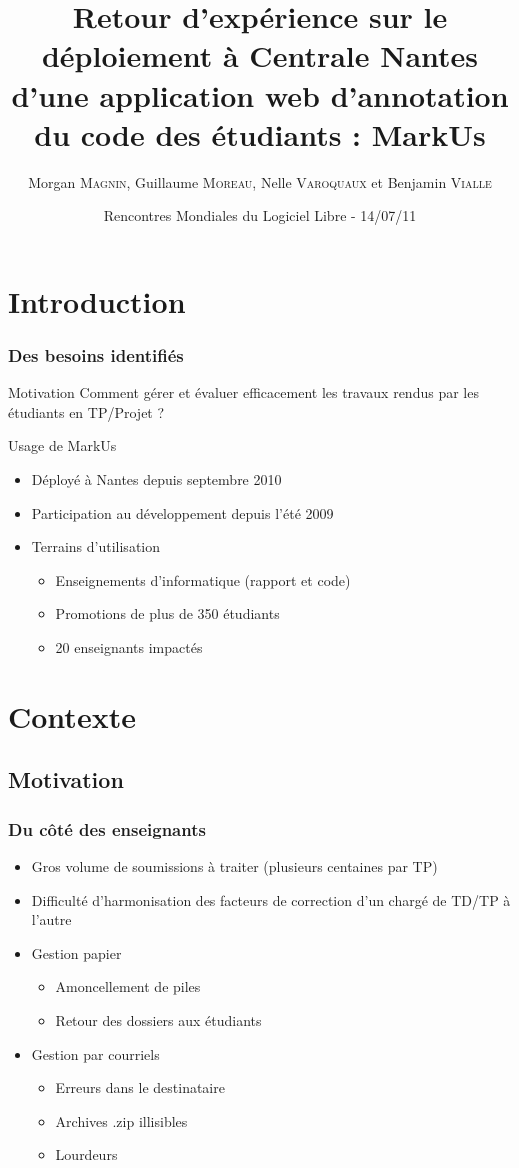 \documentclass[hyperref,french,usenames,xcolor=dvipsnames]{beamer}
\title[REX MarkUs]%
{Retour d’expérience sur le déploiement à Centrale Nantes d’une application web d’annotation du code des étudiants : MarkUs}
\author[M. \textsc{Magnin}, G. \textsc{Moreau}, N. \textsc{Varoquaux}, B. \textsc{Vialle}]%
{Morgan \textsc{Magnin}, Guillaume \textsc{Moreau}, Nelle \textsc{Varoquaux} et Benjamin \textsc{Vialle}
}
\institute[ECN]{
\structure{
École Centrale de Nantes}
}
\date[14/07/2011]{Rencontres Mondiales du Logiciel Libre - 14/07/11}
\begin{document}
\frame{\titlepage}


\section*{Introduction}

\frame
{
  \frametitle{Des besoins identifiés}

\begin{alertblock}{Motivation}
Comment gérer et évaluer efficacement les travaux rendus par les étudiants en TP/Projet ?
\end{alertblock}

\begin{block}{Usage de MarkUs}
\begin{itemize} 
\item Déployé à Nantes depuis septembre 2010 
\item Participation au développement depuis l'été 2009 
\item Terrains d'utilisation
\begin{itemize} 
\item Enseignements d'informatique (rapport et code)
\item Promotions de plus de 350 étudiants
\item 20 enseignants impactés
\end{itemize} 
\end{itemize} 
\end{block}
}

\section*{Contexte}

\subsection*{Motivation}

\frame
{
  \frametitle{Du côté des enseignants}

\begin{itemize}
\item Gros volume de soumissions à traiter (plusieurs centaines par TP)
\item Difficulté d'harmonisation des facteurs de correction d'un chargé de TD/TP à l'autre
\item Gestion papier
\begin{itemize}
\item Amoncellement de piles
\item Retour des dossiers aux étudiants
\end{itemize}
\item Gestion par courriels
\begin{itemize}
\item Erreurs dans le destinataire
\item Archives .zip illisibles
\item Lourdeurs
\end{itemize}
\end{itemize}
}
\end{document}
